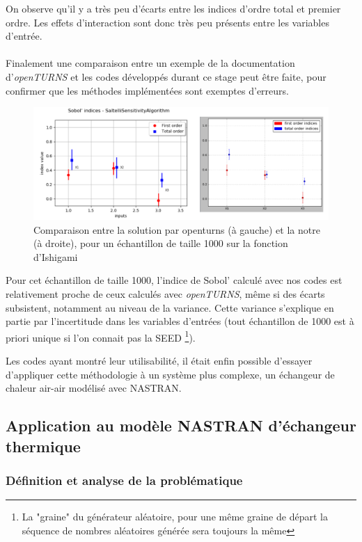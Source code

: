 \documentclass[a4paper,10pt]{article}
\begin{document}
On observe qu'il y a très peu d'écarts entre les indices d'ordre total et premier ordre. Les effets d'interaction sont donc très peu présents entre les variables d'entrée.\\
\\
Finalement une comparaison entre un exemple de la documentation d'\textit{openTURNS} et les codes développés durant ce stage peut être faite, pour confirmer que les méthodes implémentées sont exemptes d'erreurs. 

\begin{figure}[H]
   \centering   
   \includegraphics[scale=0.255]{comparisonOtMe.png}
      \caption{Comparaison entre la solution par openturns (à gauche) et la notre (à droite), pour un échantillon de taille 1000 sur la fonction d'Ishigami}
         \label{Comparison}
\end{figure}

Pour cet échantillon de taille 1000, l'indice de Sobol' calculé avec nos codes est relativement proche de ceux calculés avec \textit{openTURNS}, même si des écarts subsistent, notamment au niveau de la variance. Cette variance s'explique en partie par l'incertitude dans les variables d'entrées (tout échantillon de 1000 est à priori unique si l'on connait pas la SEED \footnote{La "graine" du générateur aléatoire, pour une même graine de départ la séquence de nombres aléatoires générée sera toujours la même}).

Les codes ayant montré leur utilisabilité, il était enfin possible d'essayer d'appliquer cette méthodologie à un système plus complexe, un échangeur de chaleur air-air modélisé avec NASTRAN. 
 
\subsection{Application au modèle NASTRAN d'échangeur thermique}
\subsubsection{Définition et analyse de la problématique}
\end{document}
